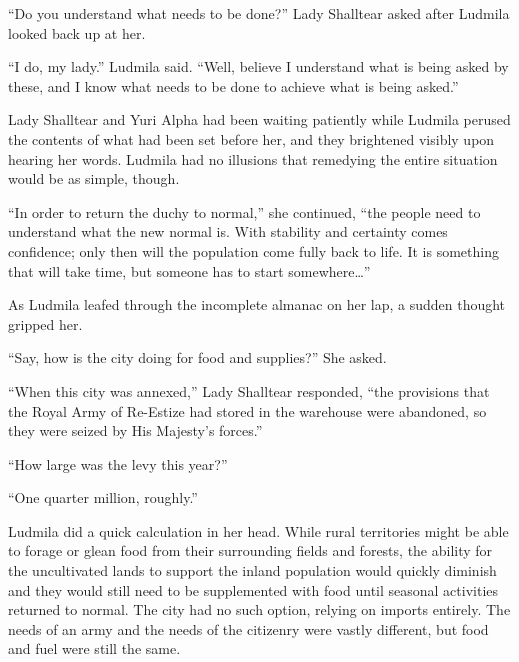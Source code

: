  

“Do you understand what needs to be done?” Lady Shalltear asked after Ludmila looked back up at her.

 

“I do, my lady.” Ludmila said. “Well, believe I understand what is being asked by these, and I know what needs to be done to achieve what is being asked.”

 

Lady Shalltear and Yuri Alpha had been waiting patiently while Ludmila perused the contents of what had been set before her, and they brightened visibly upon hearing her words. Ludmila had no illusions that remedying the entire situation would be as simple, though.

 

“In order to return the duchy to normal,” she continued, “the people need to understand what the new normal is. With stability and certainty comes confidence; only then will the population come fully back to life. It is something that will take time, but someone has to start somewhere…”

 

As Ludmila leafed through the incomplete almanac on her lap, a sudden thought gripped her.

 

“Say, how is the city doing for food and supplies?” She asked.

 

“When this city was annexed,” Lady Shalltear responded, “the provisions that the Royal Army of Re-Estize had stored in the warehouse were abandoned, so they were seized by His Majesty’s forces.”

 

“How large was the levy this year?”

 

“One quarter million, roughly.”

 

Ludmila did a quick calculation in her head. While rural territories might be able to forage or glean food from their surrounding fields and forests, the ability for the uncultivated lands to support the inland population would quickly diminish and they would still need to be supplemented with food until seasonal activities returned to normal. The city had no such option, relying on imports entirely. The needs of an army and the needs of the citizenry were vastly different, but food and fuel were still the same.

 

